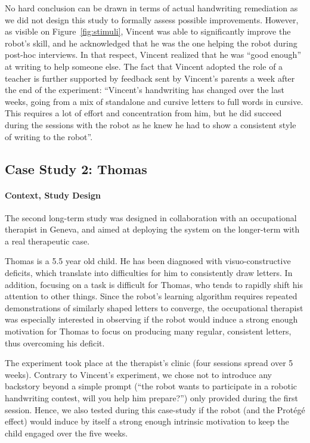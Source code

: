 \documentclass{article}
\begin{document}
No hard conclusion can be drawn in terms of actual handwriting remediation as we
did not design this study to formally assess possible improvements. However, as
visible on Figure~\ref{fig:stimuli}, Vincent was able to significantly improve
the robot's skill, and  he acknowledged that he was the one helping the robot
during post-hoc interviews. In that respect, Vincent realized that he was ``good
enough'' at writing to help someone else. The fact that Vincent adopted
the role of a teacher is further supported by feedback sent by
Vincent's parents a week after the end of the experiment: ``Vincent's
handwriting has changed over the last weeks, going from a mix of standalone and
cursive letters to full words in cursive. This requires a lot of effort and
concentration from him, but he did succeed during the sessions with the robot as
he knew he had to show a consistent style of writing to the robot''.


\subsection{Case Study 2: Thomas}
\label{thomas}

\paragraph{Context, Study Design}

The second long-term study was designed in collaboration with an occupational
therapist in Geneva, and aimed at deploying the system on the longer-term with a
real therapeutic case.

Thomas is a 5.5 year old child. He has been diagnosed with visuo-constructive
deficits, which translate into difficulties for him to consistently draw
letters. In addition, focusing on a task is difficult for Thomas, who tends to
rapidly shift his attention to other things. Since the robot's learning
algorithm requires repeated demonstrations of similarly shaped letters to
converge, the occupational therapist was especially interested in observing if
the robot would induce a strong enough motivation for Thomas to focus on
producing many regular, consistent letters, thus overcoming his deficit.

The experiment took place at the therapist's clinic (four sessions spread
over 5 weeks). Contrary to Vincent's experiment, we chose not to introduce any
backstory beyond a simple prompt (``the robot wants to participate in a robotic
handwriting contest, will you help him prepare?'') only provided during the
first session. Hence, we also tested during this case-study if the robot (and
the Protégé effect) would induce by itself a strong enough intrinsic motivation
to keep the child engaged over the five weeks.
\end{document}
